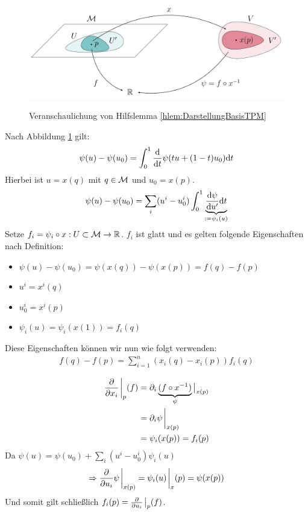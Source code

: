 \begin{bew} \leavevmode

\begin{figure}[H]
\centering
\includegraphics[width=1\linewidth]{figures/tikz/lemma_tangentialvectors.pdf}
\label{img:lemmaDarstellungBasisTPM}
\caption{Veranschaulichung von Hilfslemma \ref{hlem:DarstellungBasisTPM}}
\end{figure}

Nach Abbildung \ref{img:lemmaDarstellungBasisTPM} gilt:
\begin{align*}
\psi(u) - \psi(u_0) = \int^1_0 \dv{t} \psi(t u + (1- t) u_0) \dd t
\end{align*}
Hierbei ist $u=x(q)$ mit $q \in \mathcal{M}$ und $u_0 = x(p)$.
\begin{align*}
\psi(u) - \psi(u_0) = \sum_i (u^i- u^i_0) \int^1_0 \underbrace{\dv{\psi}{u'} (t u + (1 - t) u_0) \dd t}_{:= \psi_i (u)}
\end{align*}
Setze $f_i = \psi_i \circ x : U \subset \mathcal{M} \to \mathbb{R}$.
$f_i$ ist glatt und es gelten folgende Eigenschaften nach Definition:
\begin{itemize}
\item $\psi(u)- \psi(u_0) = \psi(x(q)) - \psi(x(p)) = f(q)- f(p)$
\item $u^i = x^i (q)$
\item $u_0^i = x^i(p)$
\item $\psi_i (u) = \psi_i (x(1)) = f_i(q)$
\end{itemize}
Diese Eigenschaften können wir nun wie folgt verwenden:
\begin{align*}
f(q)- f(p) = \sum_{i=1}^n (x_i (q) - x_i (p)) f_i(q)
\end{align*}

\begin{align*}
\pdv{x_i}\eval_{p} (f) &= \partial_i \underbrace{(f \circ x^{-1})}_{\psi} \big \vert_{x(p)} \\
&= \partial_i \psi \eval_{x(p)}\\
&= \psi_i (x(p)) = f_i (p)
\end{align*}
Da $\psi(u) = \psi(u_0) + \sum_i (u^i - u^i_0)\psi_i(u)$
\begin{align*}
\Rightarrow \pdv{u_i} \psi \eval_{x(p)} = \psi_i(u) \eval_x(p) = \psi(x(p))
\end{align*}
Und somit gilt schließlich $f_i (p) = \pdv{u_i} \eval_p (f)$.
\end{bew}

